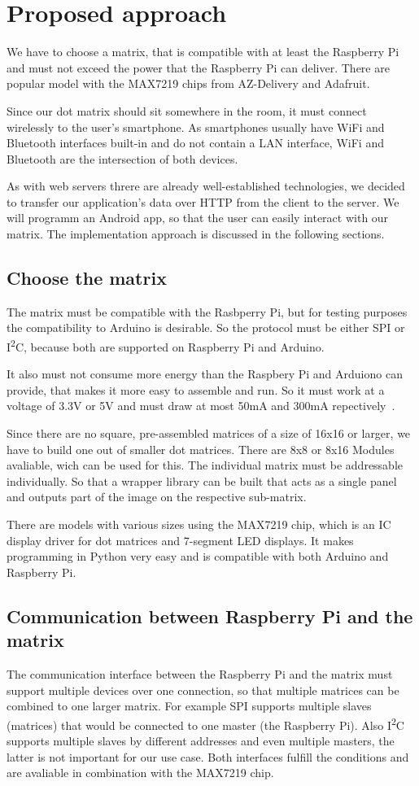 \documentclass[conference]{IEEEtran}
\begin{document}
\section{Proposed approach}
We have to choose a matrix, that is compatible with at least the Raspberry Pi and must not exceed the power that the Raspberry Pi can deliver. There are popular model with the MAX7219 chips from AZ-Delivery and Adafruit.

Since our dot matrix should sit somewhere in the room, it must connect wirelessly to the user's smartphone. As smartphones usually have WiFi and Bluetooth interfaces built-in and do not contain a LAN interface, WiFi and Bluetooth are the intersection of both devices.

As with web servers threre are already well-established technologies, we decided to transfer our application's data over HTTP from the client to the server. We will programm an Android app, so that the user can easily interact with our matrix. The implementation approach is discussed in the following sections.


\subsection{Choose the matrix}
The matrix must be compatible with the Rasbperry Pi, but for testing purposes the compatibility to Arduino is desirable. So the protocol must be either SPI or I\textsuperscript{2}C, because both are supported on Raspberry Pi and Arduino.

It also must not consume more energy than the Raspbery Pi and Arduiono can provide, that makes it more easy to assemble and run. So it must work at a voltage of 3.3V or 5V and must draw at most 50mA and 300mA repectively~\cite{rpiperipherals}.

Since there are no square, pre-assembled matrices of a size of 16x16 or larger, we have to build one out of smaller dot matrices. There are 8x8 or 8x16 Modules avaliable, wich can be used for this. The individual matrix must be addressable individually. So that a wrapper library can be built that acts as a single panel and outputs part of the image on the respective sub-matrix.

There are models with various sizes using the MAX7219 chip, which is an IC display driver for dot matrices and 7-segment LED displays. It makes programming in Python very easy and is compatible with both Arduino and Raspberry Pi.

\subsection{Communication between Raspberry Pi and the matrix}
The communication interface between the Raspberry Pi and the matrix must support multiple devices over one connection, so that multiple matrices can be combined to one larger matrix. For example SPI supports multiple slaves (matrices) that would be connected to one master (the Raspberry Pi). Also I\textsuperscript{2}C supports multiple slaves by different addresses and even multiple masters, the latter is not important for our use case. Both interfaces fulfill the conditions and are avaliable in combination with the MAX7219 chip.
\end{document}
